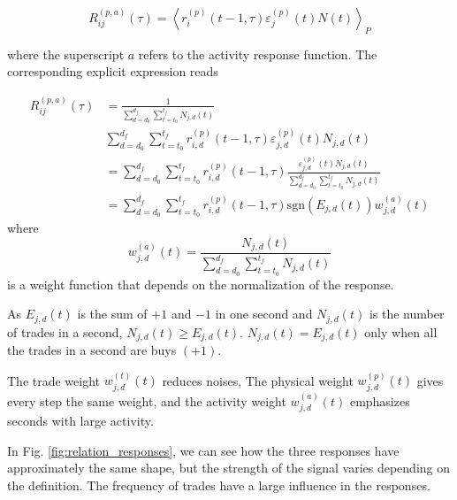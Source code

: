 \begin{equation}\label{eq:activity_response_functions_general}
    R^{\left(p, a\right)}_{ij}\left(\tau\right)=\left\langle r^{\left(p\right)}
    _{i}\left(t-1, \tau\right) \varepsilon_{j}^{\left(p\right)} \left(t\right)
    N \left(t \right) \right\rangle _{P}
\end{equation}

where the superscript $a$ refers to the activity response function. The
corresponding explicit expression reads

\begin{align}
    R_{ij}^{\left(p, a\right)}\left(\tau\right)&=\frac{1}{\sum_{d=d_{0}}
    ^{d_{f}} \sum_{t=t_{0}}^{t_{f}}N_{j,d} \left(t\right)} \nonumber \\
    &\sum_{d=d_{0}}^{d_{f}}\sum_{t=t_{0}}^{t_{f}}r^{\left(p\right)}_{i,d}
    \left(t-1,\tau\right) \varepsilon_{j,d}^{\left(p\right)}\left(t\right)
    N_{j,d} \left(t\right)\\
    &=\sum_{d=d_{0}}^{d_{f}} \sum_{t=t_{0}}^{t_{f}}r^{\left(p\right)}_{i,d}
    \left(t-1,\tau\right) \frac{\varepsilon_{j,d}^{\left(p\right)}\left(t \right)
    N_{j,d}\left(t\right)} {\sum_{d=d_{0}}^{d_{f}}\sum_{t=t_{0}}^{t_{f}}
    N_{j,d}\left(t \right)} \nonumber \\
    &=\sum_{d=d_{0}}^{d_{f}} \sum_{t=t_{0}}^{t_{f}}r^{\left(p\right)}_{i,d}
    \left(t-1,\tau\right) \text{sgn}\left(E_{j,d}\left(t\right)\right)
    w_{j,d}^{\left(a\right)}\left(t\right)
\end{align}
where
\begin{equation}
    w_{j,d}^{\left(a\right)}\left(t\right) = \frac{N_{j,d}\left(t \right)}
    {\sum_{d=d_{0}}^{d_{f}}\sum_{t=t_{0}}^{t_{f}}N_{j,d}\left(t\right)}
\end{equation}
is a weight function that depends on the normalization of the response.

As $E_{j,d}\left(t\right)$ is the sum of $+1$ and $-1$ in one second and
$N_{j,d}\left(t\right)$ is the number of trades in a second,
$N_{j,d}\left(t\right) \ge E_{j,d}\left(t\right)$.
$N_{j,d}\left(t\right) = E_{j,d}\left(t\right)$ only when all the trades in a
second are buys $(+1)$.

The trade weight $w_{j,d}^{\left(t\right)}\left(t\right)$ reduces noises, The
physical weight $w_{j,d}^{\left(p\right)}\left(t\right)$ gives every step the
same weight, and the activity weight $w_{j,d}^{\left(a\right)}\left(t\right)$
emphasizes seconds with large activity.

In Fig. \ref{fig:relation_responses}, we can see how the three
responses have approximately the same shape, but the strength of the signal
varies depending on the definition. The frequency of trades have a large
influence in the responses.

